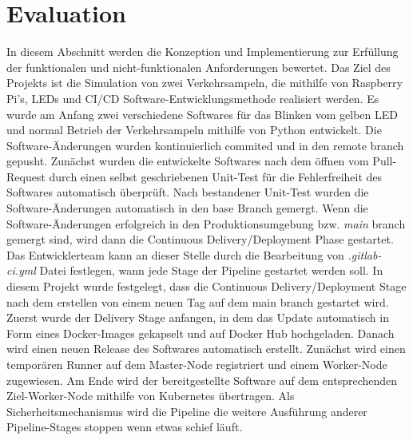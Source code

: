 \chapter{Evaluation}

In diesem Abschnitt werden die Konzeption und Implementierung zur Erfüllung der funktionalen und nicht-funktionalen Anforderungen bewertet. Das Ziel des Projekts ist die Simulation von zwei Verkehrsampeln, die mithilfe von Raspberry Pi’s, LEDs und CI/CD Software-Entwicklungsmethode realisiert werden. 
\newline
Es wurde am Anfang zwei verschiedene Softwares für das Blinken vom gelben LED und normal Betrieb der Verkehrsampeln mithilfe von Python entwickelt. Die Software-Änderungen wurden kontinuierlich commited und in den remote branch gepusht. Zunächst wurden die entwickelte Softwares nach dem öffnen vom Pull-Request durch einen selbst geschriebenen Unit-Test für die Fehlerfreiheit des Softwares automatisch überprüft. Nach bestandener Unit-Test wurden die Software-Änderungen automatisch in den base Branch gemergt. Wenn die Software-Änderungen erfolgreich in den Produktionsumgebung bzw. \textit{main} branch gemergt sind, wird dann die Continuous Delivery/Deployment Phase gestartet. Das Entwicklerteam kann an dieser Stelle durch die Bearbeitung von \textit{.gitlab-ci.yml} Datei festlegen, wann jede Stage der Pipeline gestartet werden soll. In diesem Projekt wurde festgelegt, dass die Continuous Delivery/Deployment Stage nach dem erstellen von einem neuen Tag auf dem main branch gestartet wird. Zuerst wurde der Delivery Stage anfangen, in dem das Update automatisch in Form eines Docker-Images gekapselt und auf Docker Hub hochgeladen. Danach wird einen neuen Release des Softwares automatisch erstellt. Zunächst wird einen temporären Runner auf dem Master-Node registriert und einem Worker-Node zugewiesen. Am Ende wird der bereitgestellte Software auf dem entsprechenden Ziel-Worker-Node mithilfe von Kubernetes übertragen. Als Sicherheitsmechanismus wird die Pipeline die weitere Ausführung anderer Pipeline-Stages stoppen wenn etwas schief läuft.
